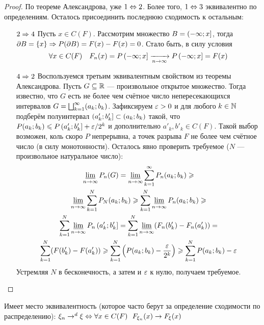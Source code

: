 \begin{proof}
	По теореме Александрова, уже $1 \Leftrightarrow 2$. Более того, $1 \Leftrightarrow 3$ эквивалентно по определениям. Осталось присоединить последнюю сходимость к остальным:
	\begin{itemize}
		\item[$2 \Rightarrow 4$] Пусть $x \in C(F)$. Рассмотрим множество $B = \left(-\infty; x\right]$, тогда $\partial B = \{x\} \Rightarrow P(\partial B) = F(x) - F(x) = 0$. Стало быть, в силу условия
		\[
			\forall x \in C(F) \quad F_n(x) = P\left(-\infty; x\right] \xrightarrow[n \to \infty]{} P\left(-\infty; x\right] = F(x)
		\]
		
		\item[$4 \Rightarrow 2$] Воспользуемся третьим эквивалентным свойством из теоремы Александрова. Пусть $G \subseteq \mathbb{R}$ --- произвольное открытое множество. Тогда известно, что $G$ есть не более чем счётное число непересекающихся интервалов $G = \bigsqcup_{k = 1}^\infty (a_k; b_k)$. Зафиксируем $\varepsilon > 0$ и для любого $k \in \mathbb{N}$ подберём полуинтервал $\left(a'_k; b'_k\right] \subset (a_k; b_k)$ такой, что $P(a_k; b_k) \leqslant P\left(a'_k; b'_k\right] + \varepsilon / 2^k$ и дополнительно $a'_k, b'_k \in C(F)$. Такой выбор возможен, коль скоро $P$ непрерывна, а точек разрыва $F$ не более чем счётное число (в силу монотонности). Осталось явно проверить требуемое ($N$ --- произвольное натуральное число):
		\begin{multline*}
			\varliminf_{n \to \infty} P_n(G) = \varliminf_{n \to \infty} \sum_{k = 1}^\infty P_n(a_k; b_k) \geqslant
			\\
			\varliminf_{n \to \infty} \sum_{k = 1}^N P_N(a_k; b_k) \geqslant \sum_{k = 1}^N \varliminf_{n \to \infty} P_n(a_k; b_k) \geqslant
			\\
			\sum_{k = 1}^N \varliminf_{n \to \infty} P_n\left(a'_k; b'_k\right] = \sum_{k = 1}^N \varliminf_{n \to \infty} (F_n(b'_k) - F_n(a'_k)) =
			\\
			\sum_{k = 1}^N (F(b'_k) - F(a'_k)) \geqslant \sum_{k = 1}^N \left(P(a_k; b_k) - \frac{\varepsilon}{2^k}\right) \geqslant \sum_{k = 1}^N P(a_k; b_k) - \varepsilon
		\end{multline*}
		Устремляя $N$ в бесконечность, а затем и $\varepsilon$ к нулю, получаем требуемое.
	\end{itemize}
\end{proof}

\begin{corollary}
	Имеет место эквивалентность (которое часто берут за определение сходимости по распределению): $\xi_n \to^d \xi \Leftrightarrow \forall x \in C(F)\ \ F_{\xi_n}(x) \to F_\xi(x)$
\end{corollary}

